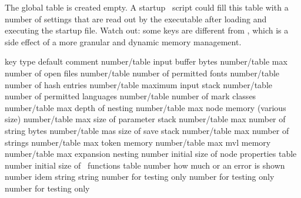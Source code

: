\stopsubsection

\stopsection

\startsection[title={The configuration}]

The global  table is created empty. A startup \LUA\ script could
fill this table with a number of settings that are read out by the executable
after loading and executing the startup file. Watch out: some keys are different
from \LUATEX, which is a side effect of a more granular and dynamic memory
management.

\starttabulate[|l|l|l|l|]
\FL
\BC key                       \BC type         \BC default  \BC comment \NC \NR
\TL
\NC {}        \NC number/table  \NC input buffer bytes \NC \NR
\NC {}          \NC number/table  \NC max number of open files \NC \NR
\NC {}          \NC number/table  \NC number of permitted fonts \NC \NR
\NC {}          \NC number/table  \NC number of hash entries \NC \NR
\NC {}         \NC number/table  \NC maximum input stack \NC \NR
\NC {}      \NC number/table  \NC number of permitted languages \NC \NR
\NC {}          \NC number/table  \NC number of mark classes \NC \NR
\NC {}          \NC number/table  \NC max depth of nesting \NC \NR
\NC {}          \NC number/table  \NC max node memory (various size) \NC \NR
\NC {}     \NC number/table  \NC max size of parameter stack \NC \NR
\NC {}          \NC number/table  \NC max number of string bytes \NC \NR
\NC {}          \NC number/table  \NC mas size of save stack \NC \NR
\NC {}        \NC number/table  \NC max number of strings \NC \NR
\NC {}         \NC number/table  \NC max token memory \NC \NR
\NC {}           \NC number/table  \NC max mvl memory \NC \NR
\ML
\NC {}        \NC number/table  \NC max expansion nesting \NC \NR
\NC {}    \NC number        \NC initial size of node properties table \NC \NR
\NC {}      \NC number        \NC initial size of \LUA\ functions table \NC \NR
\NC {}     \NC number        \NC how much or an error is shown \NC \NR
\NC {} \NC number        \NC idem \NC \NR
\ML
\NC {}        \NC string       \NC          \NC \NC \NR
\NC {}           \NC string       \NC          \NC \NC \NR
\ML
\NC {}         \NC number       \NC          \NC for testing only \NC \NR
\NC {}        \NC number       \NC          \NC for testing only \NC \NR
\NC {}     \NC number       \NC          \NC for testing only \NC \NR
\LL
\stoptabulate

